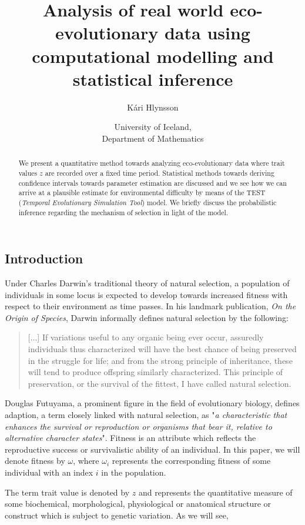\documentclass[12pt, a4paper]{article}
\title{Analysis of real world eco-evolutionary data using computational modelling and statistical inference}
\author{Kári Hlynsson}
\date{University of Iceland, \\ Department of Mathematics}
\begin{document}
\renewcommand{\abstractname}{Abstract}

\maketitle

\begin{abstract}
    \noindent We present a quantitative method towards analyzing eco-evolutionary data where trait values
    $z$ are recorded over a fixed time period. Statistical methods towards deriving confidence intervals towards
    parameter estimation are discussed and we see how we can arrive at a plausible estimate for environmental difficulty
    by means of the TEST (\emph{Temporal Evolutionary Simulation Tool}) model. We briefly discuss the probabilistic inference
    regarding the mechanism of selection in light of the model.
\end{abstract}

\begin{multicols}{2}
\section*{\sc Introduction}
Under Charles Darwin's traditional theory of natural selection, a population of individuals in some locus is expected to develop
towards increased fitness with respect to their environment as time passes. In his landmark publication, \emph{On the Origin of Species},
Darwin informally defines natural selection by the following:
\begin{quote}
    [...] If variations useful to any organic being ever occur, assuredly individuals thus characterized will have the best chance of being
    preserved in the struggle for life; and from the strong principle of inheritance, these will tend to produce offspring similarly
    characterized. This principle of preservation, or the survival of the fittest, I have called natural selection.
\end{quote}
Douglas Futuyama, a prominent figure in the field of evolutionary biology, defines adaption, a term closely linked with natural selection, as 
"\emph{a characteristic that enhances the survival or reproduction or organisms that bear it, relative to alternative character states}". Fitness
is an attribute which reflects the reproductive success or survivalistic ability of an individual. In this paper, we will denote fitness by $\omega$,
where $\omega_i$ represents the corresponding fitness of some individual with an index $i$ in the population.
\par The term trait value is denoted by $z$ and represents the quantitative measure of some biochemical, morphological, physiological or anatomical structure
or construct which is subject to genetic variation. As we will see,
\end{multicols}
\end{document}
